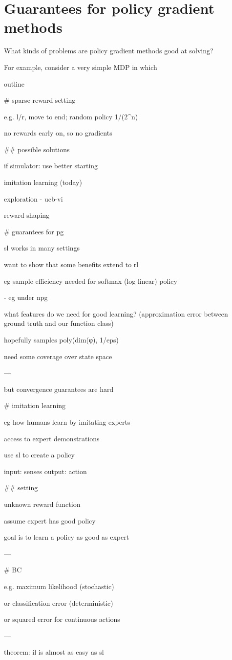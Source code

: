 \documentclass[\main/main]{subfiles}
\begin{document}
\section{Guarantees for policy gradient methods}

What kinds of problems are policy gradient methods good at solving?

For example, consider a very simple MDP in which

outline

# sparse reward setting

e.g. l/r, move to end; random policy 1/(2^n)

no rewards early on, so no gradients

## possible solutions

if simulator: use better starting

imitation learning (today)

exploration
- ucb-vi

reward shaping

# guarantees for pg

sl works in many settings

want to show that some benefits extend to rl

eg sample efficiency needed for softmax (log linear) policy

- eg under npg

what features do we need for good learning? (approximation error between ground truth and our function class)

hopefully samples poly(dim(φ), 1/eps)

need some coverage over state space

---

but convergence guarantees are hard

# imitation learning

eg how humans learn by imitating experts

access to expert demonstrations

use sl to create a policy

input: senses
output: action

## setting

unknown reward function

assume expert has good policy

goal is to learn a policy as good as expert

---

# BC

e.g. maximum likelihood (stochastic)

or classification error (deterministic)

or squared error for continuous actions

---

theorem: il is almost as easy as sl
\end{document}
